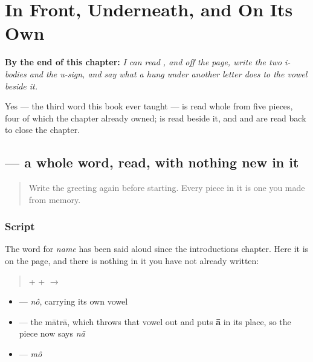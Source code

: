 
\chapter{In Front, Underneath, and On Its Own}
\label{ch:bn-signs-around-the-letter}

\begin{chapteropening}
\textbf{By the end of this chapter:} \emph{I can read ,  and  off the page, write the two i-bodies and the u-sign, and say what a  hung under another letter does to the vowel beside it.}

Yes — the third word this book ever taught — is read whole from five pieces, four of which the chapter already owned;  is read beside it, and  and  are read back to close the chapter.
\end{chapteropening}

\section[\texorpdfstring{\bn{নাম} (nām)}{নাম (nām)}]{ — a whole word, read, with nothing new in it}

\label{lesson:BN-W02-naam-read}



\begin{quote}
Write the greeting again before starting. Every piece in it is one you made from memory.
\end{quote}

\subsection*{Script}
The word for \emph{name} has been said aloud since the introductions chapter. Here it is on the page, and there is nothing in it you have not already written:

\begin{quote}
\textbf{} + \textbf{} + \textbf{} $\to$ \textbf{}
\end{quote}

\begin{itemize}
\raggedright
  \item \textbf{} — \emph{nô}, carrying its own vowel
  \item \textbf{} — the mātrā, which throws that vowel out and puts \textbf{ā} in its place, so the piece now says \emph{nā}
  \item \textbf{} — \emph{mô}
\end{itemize}

